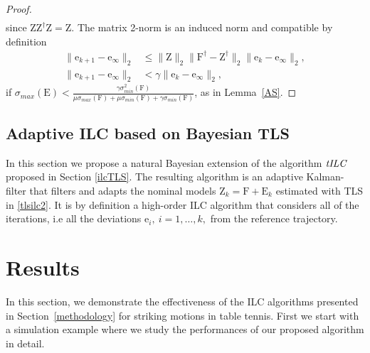 \documentclass[10pt,a4paper]{article}
\theoremstyle{plain}
\theoremstyle{definition}
\newcommand{\boldvec}[1]{\boldsymbol{\mathrm{#1}}}
\let\vec\boldvec
\newcommand{\error}{\vec{e}} %
\newcommand{\latentMat}{\vec{Z}} %
\newcommand{\errorMat}{\vec{E}} %
\newcommand{\lmatrix}{\vec{L}} %
\newcommand{\systemMat}{\vec{F}} %
\newcommand{\alg}{\emph{tILC}}
\begin{document}
\begin{proof}
\begin{align}
\end{align}
%
since $\latentMat\latentMat^{\dagger}\latentMat = \latentMat$. The matrix 2-norm is an induced norm and compatible by definition
%
\begin{align}
\|\error_{k+1} - \error_{\infty}\|_2 &\leq \|\latentMat\|_2\|\systemMat^{\dagger} - \latentMat^{\dagger}\|_2\|\error_{k} - \error_{\infty}\|_2,\\
\|\error_{k+1} - \error_{\infty}\|_2 &< \gamma\|\error_{k} - \error_{\infty}\|_2,
\end{align}
%
if $\sigma_{max}(\errorMat) < \frac{\gamma\sigma_{min}^{2}(\systemMat)}{\mu\sigma_{max}(\systemMat) + \mu\sigma_{min}(\systemMat) + \gamma\sigma_{min}(\systemMat)}$, as in Lemma~\ref{AS}.
%
\end{proof}
%
%

\subsection{Adaptive ILC based on Bayesian TLS}\label{adaptiveILC}

In this section we propose a natural Bayesian extension of the algorithm $\alg$ proposed in Section \ref{ilcTLS}. The resulting algorithm is an adaptive Kalman-filter that filters and adapts the nominal models $\latentMat_k = \systemMat + \errorMat_k$ estimated with TLS in \eqref{tlsilc2}. It is by definition a high-order ILC algorithm that considers all of the iterations, i.e all the deviations $\error_i, \ i = 1, \ldots, k,$ from the reference trajectory. 



\section{Results}\label{results}

In this section, we demonstrate the effectiveness of the ILC algorithms presented in Section~\ref{methodology} for striking motions in table tennis. First we start with a simulation example where we study the performances of our proposed algorithm in detail.
%
\end{document}
